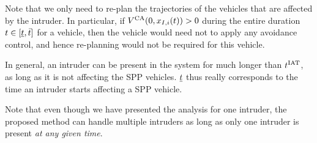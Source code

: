 \begin{remark}
Note that we only need to re-plan the trajectories of the vehicles that are affected by the intruder. In particular, if $V^{\text{CA}}(0, x_{I, i}(t)) > 0$ during the entire duration $t \in [\underline{t}, \bar{t}]$ for a vehicle, then the vehicle would need not to apply any avoidance control, and hence re-planning would not be required for this vehicle. 
\end{remark}

\begin{remark}
In general, an intruder can be present in the system for much longer than $t^\text{IAT}$, as long as it is not affecting the SPP vehicles. $\underline{t}$ thus really corresponds to the time an intruder starts affecting a SPP vehicle.
\end{remark}

\begin{remark}
Note that even though we have presented the analysis for one intruder, the proposed method can handle multiple intruders as long as only one intruder is present \textit{at any given time}. 
\end{remark}

